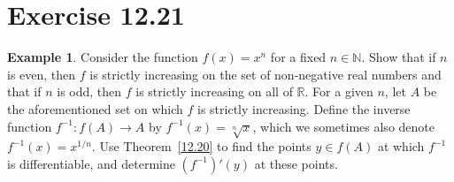 \documentclass[openany, amssymb, psamsfonts]{amsart}
\newcommand{\bbN}{\mathbb{N}}
\newcommand{\bbR}{\mathbb{R}}
\theoremstyle{definition}
\newtheorem{exmp}{Example}[section]
\numberwithin{equation}{section}
\begin{document}
\section*{Exercise 12.21}
\begin{exmp} \label{12.21}
Consider the function $f(x)=x^n$ for a fixed $n\in\bbN$.  Show that if $n$ is even, then $f$ is strictly increasing
on the set of non-negative real numbers and that if $n$ is odd, then $f$ is strictly increasing on all of $\bbR$.
For a given $n$, let $A$ be the aforementioned set on which $f$ is strictly increasing.  Define the
inverse function $f^{-1}:f(A)\rightarrow A$ by $f^{-1}(x)=\sqrt[n]{x}$, which we sometimes also
denote $f^{-1}(x)=x^{1/n}$.  Use Theorem\ \ref{12.20} to find the points $y\in f(A)$ at
which $f^{-1}$ is differentiable, and determine $(f^{-1})'(y)$ at these points.
\end{exmp}
\end{document}
